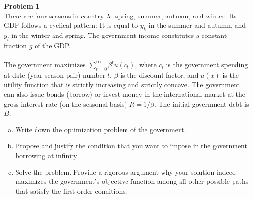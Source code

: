 \documentclass{article}
\newenvironment{problem}[2][Problem]
    { \begin{mdframed}[backgroundcolor=gray!20] \textbf{#1 #2} \\}
    {  \end{mdframed}}
\begin{document}
    \begin{problem}{1}
    There are four seasons in country A: spring, summer, autumn, and winter. Its GDP
    follows a cyclical pattern: It is equal to $ y_{h} $ in the summer and autumn, and $ y_{l} $ in the winter and spring. The government income constitutes a constant fraction $ g $ of the GDP.\\\\
    The government maximizes $ \sum_{t=0}^{\infty}\beta^{t}u(c_{t}) $, where $ c_{t} $ is the government spending at date (year-season pair) number $ t $, $ \beta $ is the discount factor, and $ u(x) $ is the utility function that is strictly
    increasing and strictly concave. The government can also issue bonds (borrow) or invest money
    in the international market at the gross interest rate (on the seasonal basis) $ R = 1/\beta $. The initial government debt is $ B $.
    \begin{enumerate}[(a)]
    	\item  Write down the optimization problem of the government.
    	\item Propose and justify the condition that you want to impose in the government borrowing at
    	infinity
    	\item Solve the problem. Provide a rigorous argument why your solution indeed maximizes the
    	government’s objective function among all other possible paths that satisfy the first-order
    	conditions.
    \end{enumerate}
    \end{problem}
    
\end{document}
